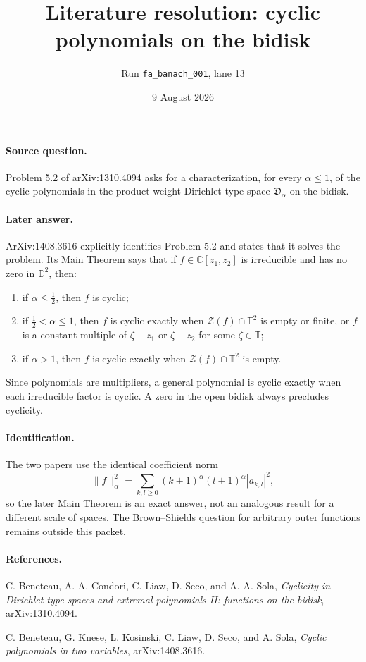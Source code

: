 \documentclass[11pt]{article}
\title{Literature resolution: cyclic polynomials on the bidisk}
\author{Run \texttt{fa\_banach\_001}, lane 13}
\date{9 August 2026}
\begin{document}
\maketitle

\paragraph{Source question.}
Problem 5.2 of arXiv:1310.4094 asks for a characterization, for every
$\alpha\leq 1$, of the cyclic polynomials in the product-weight
Dirichlet-type space $\mathfrak D_\alpha$ on the bidisk.

\paragraph{Later answer.}
ArXiv:1408.3616 explicitly identifies Problem 5.2 and states that it solves
the problem. Its Main Theorem says that if $f\in\mathbb C[z_1,z_2]$ is
irreducible and has no zero in $\mathbb D^2$, then:
\begin{enumerate}
\item if $\alpha\leq \tfrac12$, then $f$ is cyclic;
\item if $\tfrac12<\alpha\leq1$, then $f$ is cyclic exactly when
$\mathcal Z(f)\cap\mathbb T^2$ is empty or finite, or $f$ is a constant
multiple of $\zeta-z_1$ or $\zeta-z_2$ for some $\zeta\in\mathbb T$;
\item if $\alpha>1$, then $f$ is cyclic exactly when
$\mathcal Z(f)\cap\mathbb T^2$ is empty.
\end{enumerate}
Since polynomials are multipliers, a general polynomial is cyclic exactly
when each irreducible factor is cyclic. A zero in the open bidisk always
precludes cyclicity.

\paragraph{Identification.}
The two papers use the identical coefficient norm
\[
 \lVert f\rVert_\alpha^2=\sum_{k,l\geq0}(k+1)^\alpha(l+1)^\alpha
 |a_{k,l}|^2,
\]
so the later Main Theorem is an exact answer, not an analogous result for a
different scale of spaces. The Brown--Shields question for arbitrary outer
functions remains outside this packet.

\paragraph{References.}
C. Beneteau, A. A. Condori, C. Liaw, D. Seco, and A. A. Sola,
\emph{Cyclicity in Dirichlet-type spaces and extremal polynomials II:
functions on the bidisk}, arXiv:1310.4094.

C. Beneteau, G. Knese, L. Kosinski, C. Liaw, D. Seco, and A. Sola,
\emph{Cyclic polynomials in two variables}, arXiv:1408.3616.
\end{document}
